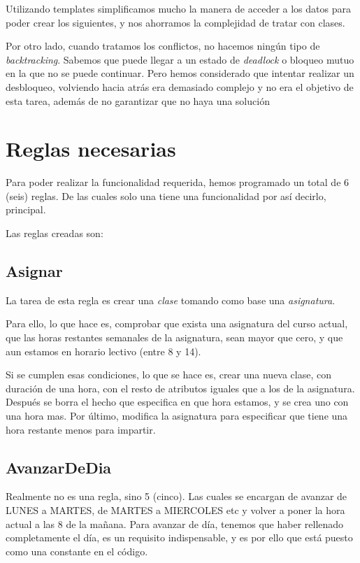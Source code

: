 \documentclass{report}
\begin{document}
Utilizando templates simplificamos mucho la manera de acceder a los datos para poder crear los siguientes, y
nos ahorramos la complejidad de tratar con clases.

Por otro lado, cuando tratamos los conflictos, no hacemos ning\'{u}n tipo de \emph{backtracking}. Sabemos que 
puede llegar a un estado de \emph{deadlock} o bloqueo mutuo en la que no se puede continuar. Pero hemos considerado
que intentar realizar un desbloqueo, volviendo hacia atr\'{a}s era demasiado complejo y no era el objetivo de esta
tarea, adem\'{a}s de no garantizar que no haya una soluci\'{o}n

\section{Reglas necesarias}
Para poder realizar la funcionalidad requerida, hemos programado un total de 6 (seis) reglas. De las cuales solo
una tiene una funcionalidad por as\'{i} decirlo, principal.

Las reglas creadas son:
\subsection{Asignar}
La tarea de esta regla es crear una \emph{clase} tomando como base una \emph{asignatura}.

Para ello, lo que hace es, comprobar que exista una asignatura del curso actual, que las horas restantes semanales
de la asignatura, sean mayor que cero, y que aun estamos en horario lectivo (entre 8 y 14).

Si se cumplen esas condiciones, lo que se hace es, crear una nueva clase, con duraci\'{o}n de una hora, con el resto de
atributos iguales que a los de la asignatura. Despu\'{e}s se borra el hecho que especifica en que hora estamos, y
se crea uno con una hora mas. Por \'{u}ltimo, modifica la asignatura para especificar que tiene una hora restante
menos para impartir.

\subsection{AvanzarDeDia}
Realmente no es una regla, sino 5 (cinco). Las cuales se encargan de avanzar de LUNES a MARTES, de MARTES a MIERCOLES
etc y volver a poner la hora actual a las 8 de la ma\~{n}ana. Para avanzar de d\'{i}a, tenemos que haber rellenado
completamente el d\'{i}a, es un requisito indispensable, y es por ello que est\'{a} puesto como una constante en
el c\'{o}digo.
\end{document}
